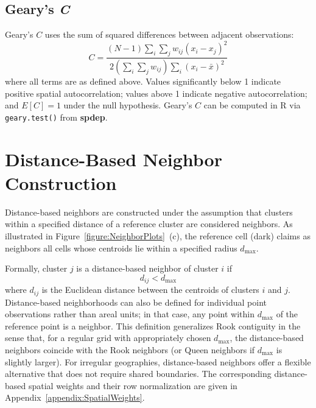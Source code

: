 \documentclass{article}[11pt]
\begin{document}
\subsection*{Geary's \textit{C}}

Geary's $\textit{C}$ uses the sum of squared differences between adjacent observations:
\begin{equation}
    \textit{C} = \frac{(N-1)\displaystyle\sum_{i}\sum_{j} w_{ij}(x_i - x_j)^2}
                       {2\left(\displaystyle\sum_{i}\sum_{j} w_{ij}\right)\displaystyle\sum_{i}(x_i - \bar{x})^2}
\end{equation}
where all terms are as defined above. Values significantly below 1 indicate positive spatial autocorrelation; values above 1 indicate negative autocorrelation; and $E[\textit{C}] = 1$ under the null hypothesis. Geary's $\textit{C}$ can be computed in R via \texttt{geary.test()} from \textbf{spdep}\cite{bivand_comparing_2018}.

\section{Distance-Based Neighbor Construction}\label{appendix:DistanceBased}

Distance-based neighbors\cite{fotheringham_sage_2009} are constructed under the assumption that clusters within a specified distance of a reference cluster are considered neighbors. As illustrated in Figure~\ref{figure:NeighborPlots}~(c), the reference cell (dark) claims as neighbors all cells whose centroids lie within a specified radius $d_{\max}$.

Formally, cluster $j$ is a distance-based neighbor of cluster $i$ if
\begin{equation}
    d_{ij} < d_{\max}
\end{equation}
where $d_{ij}$ is the Euclidean distance between the centroids of clusters $i$ and $j$. Distance-based neighborhoods can also be defined for individual point observations rather than areal units; in that case, any point within $d_{\max}$ of the reference point is a neighbor. This definition generalizes Rook contiguity in the sense that, for a regular grid with appropriately chosen $d_{\max}$, the distance-based neighbors coincide with the Rook neighbors (or Queen neighbors if $d_{\max}$ is slightly larger). For irregular geographies, distance-based neighbors offer a flexible alternative that does not require shared boundaries. The corresponding distance-based spatial weights and their row normalization are given in Appendix~\ref{appendix:SpatialWeights}.
\end{document}
